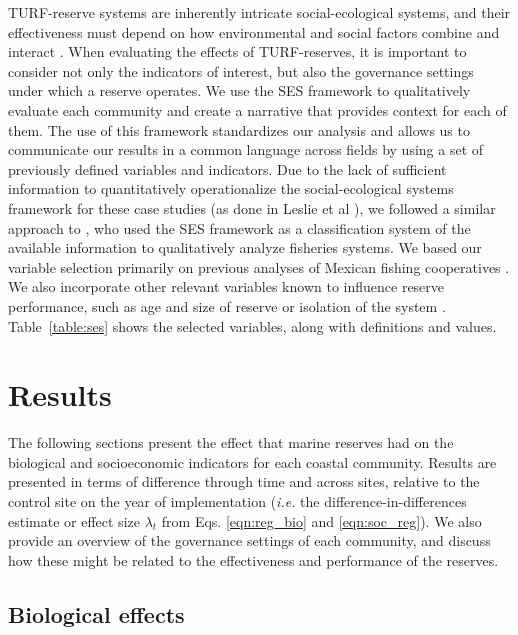 \documentclass[10pt,letterpaper]{article}
\begin{document}
TURF-reserve systems are inherently intricate social-ecological systems, and their effectiveness must depend on how environmental and social factors combine and interact \cite{ostrom_2009,gelcich_2015}. When evaluating the effects of TURF-reserves, it is important to consider not only the indicators of interest, but also the governance settings under which a reserve operates. We use the SES framework to qualitatively evaluate each community and create a narrative that provides context for each of them. The use of this framework standardizes our analysis and allows us to communicate our results in a common language across fields by using a set of previously defined variables and indicators. Due to the lack of sufficient information to quantitatively operationalize the social-ecological systems framework for these case studies (as done in Leslie et al \cite{leslie_2015-na}), we followed a similar approach to \cite{basurto_2013-oq}, who used the SES framework as a classification system of the available information to qualitatively analyze fisheries systems. We based our variable selection primarily on previous analyses of Mexican fishing cooperatives \cite{leslie_2015-na,basurto_2013-oq}. We also incorporate other relevant variables known to influence reserve performance, such as age and size of reserve or isolation of the system \cite{difranco_2016-Xw,edgar_2014-UO}. Table~\ref{table:ses} shows the selected variables, along with definitions and values.

\section*{Results}

The following sections present the effect that marine reserves had on the biological and socioeconomic indicators for each coastal community. Results are presented in terms of difference through time and across sites, relative to the control site on the year of implementation (\emph{i.e.} the difference-in-differences estimate or effect size $\lambda_t$ from Eqs. \ref{eqn:reg_bio} and \ref{eqn:soc_reg}). We also provide an overview of the governance settings of each community, and discuss how these might be related to the effectiveness and performance of the reserves.

\subsection*{Biological effects}
\end{document}
